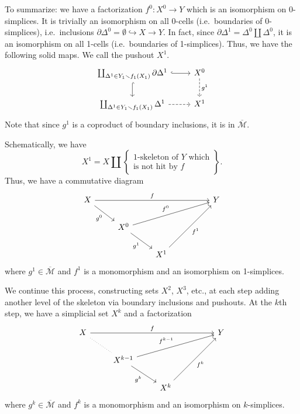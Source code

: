 \documentclass[main.tex]{subfiles}
\begin{document}
\begin{example}
  To summarize: we have a factorization $f^{0}\colon X^{0} \to Y$ which is an isomorphism on 0-simplices. It is trivially an isomorphism on all 0-cells (i.e.\ boundaries of 0-simplices), i.e.\ inclusions $\partial \Delta^{0} = \emptyset \hookrightarrow X \to Y$. In fact, since $\partial \Delta^{1} = \Delta^{0} \amalg \Delta^{0}$, it is an isomorphism on all 1-cells (i.e.\ boundaries of 1-simplices). Thus, we have the following solid maps. We call the pushout $X^{1}$.
  \begin{equation*}
    \begin{tikzcd}
      \coprod_{\Delta^{1} \in Y_{1} \smallsetminus f_{1}(X_{1})} \partial \Delta^{1}
      \arrow[r, hookrightarrow]
      \arrow[d, hookrightarrow]
      & X^{0}
      \arrow[d, dashed, "g^{1}"]
      \\
      \coprod_{\Delta^{1} \in Y_{1} \smallsetminus f_{1}(X_{1})} \Delta^{1}
      \arrow[r, dashed]
      & X^{1}
    \end{tikzcd}
  \end{equation*}
  Note that since $g^{1}$ is a coproduct of boundary inclusions, it is in $\overline{\mathcal{M}}$.

  Schematically, we have
  \begin{equation*}
    X^{1} = X \amalg \left\{ \substack{\text{1-skeleton of $Y$ which}\\\text{is not hit by $f$}} \right\}.
  \end{equation*}
  Thus, we have a commutative diagram
  \begin{equation*}
    \begin{tikzcd}
      X
      \arrow[rrrr, "f"]
      \arrow[dr, swap, "g^{0}"]
      &&&& Y
      \\
      & X^{0}
      \arrow[urrr, "f^{0}"]
      \arrow[dr, swap, "g^{1}"]
      \\
      && X^{1}
      \arrow[uurr, swap, "f^{1}"]
    \end{tikzcd}
  \end{equation*}
  where $g^{1} \in \overline{\mathcal{M}}$ and $f^{1}$ is a monomorphism and an isomorphism on 1-simplices.

  We continue this process, constructing sets $X^{2}$, $X^{3}$, etc., at each step adding another level of the skeleton via boundary inclusions and pushouts. At the $k$th step, we have a simplicial set $X^{k}$ and a factorization
  \begin{equation*}
    \begin{tikzcd}
      X
      \arrow[rrrr, "f"]
      \arrow[dr, dotted, no head]
      &&&& Y
      \\
      & X^{k-1}
      \arrow[urrr, "f^{k-1}"]
      \arrow[dr, swap, "g^{k}"]
      \\
      && X^{k}
      \arrow[uurr, swap, "f^{k}"]
    \end{tikzcd}
  \end{equation*}
  where $g^{k} \in \overline{\mathcal{M}}$ and $f^{k}$ is a monomorphism and an isomorphism on $k$-simplices.


\end{example}
\end{document}

